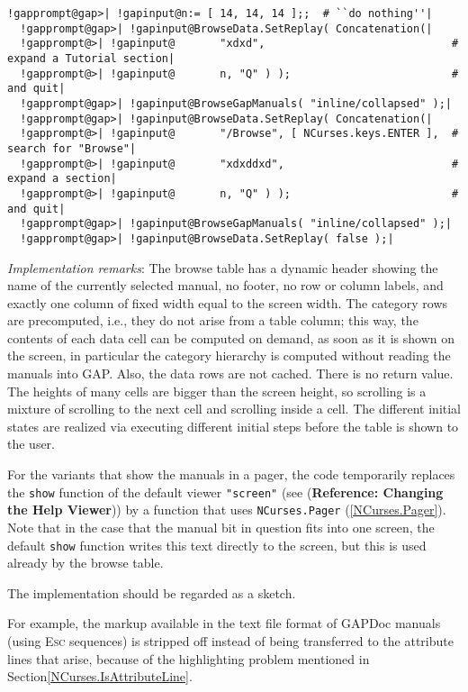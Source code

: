 \documentclass[a4paper,11pt]{report}
\begin{document}
{{{ 
\begin{Verbatim}[commandchars=!@|,fontsize=\small,frame=single,label=Example]
  !gapprompt@gap>| !gapinput@n:= [ 14, 14, 14 ];;  # ``do nothing''|
  !gapprompt@gap>| !gapinput@BrowseData.SetReplay( Concatenation(|
  !gapprompt@>| !gapinput@       "xdxd",                             # expand a Tutorial section|
  !gapprompt@>| !gapinput@       n, "Q" ) );                         # and quit|
  !gapprompt@gap>| !gapinput@BrowseGapManuals( "inline/collapsed" );|
  !gapprompt@gap>| !gapinput@BrowseData.SetReplay( Concatenation(|
  !gapprompt@>| !gapinput@       "/Browse", [ NCurses.keys.ENTER ],  # search for "Browse"|
  !gapprompt@>| !gapinput@       "xdxddxd",                          # expand a section|
  !gapprompt@>| !gapinput@       n, "Q" ) );                         # and quit|
  !gapprompt@gap>| !gapinput@BrowseGapManuals( "inline/collapsed" );|
  !gapprompt@gap>| !gapinput@BrowseData.SetReplay( false );|
\end{Verbatim}
 

 \emph{Implementation remarks}: The browse table has a dynamic header showing the name of the currently
selected manual, no footer, no row or column labels, and exactly one column of
fixed width equal to the screen width. The category rows are precomputed,
i.{\nobreakspace}e., they do not arise from a table column; this way, the
contents of each data cell can be computed on demand, as soon as it is shown
on the screen, in particular the category hierarchy is computed without
reading the manuals into \textsf{GAP}. Also, the data rows are not cached. There is no return value. The heights of
many cells are bigger than the screen height, so scrolling is a mixture of
scrolling to the next cell and scrolling inside a cell. The different initial
states are realized via executing different initial steps before the table is
shown to the user. 

 For the variants that show the manuals in a pager, the code temporarily
replaces the \texttt{show} function of the default viewer \texttt{"screen"} (see  (\textbf{Reference: Changing the Help Viewer})) by a function that uses \texttt{NCurses.Pager} (\ref{NCurses.Pager}). Note that in the case that the manual bit in question fits into one screen,
the default \texttt{show} function writes this text directly to the screen, but this is used already by
the browse table. 

 The implementation should be regarded as a sketch. 

 For example, the markup available in the text file format of \textsf{GAPDoc} manuals (using \textsc{Esc} sequences) is stripped off instead of being transferred to the attribute lines
that arise, because of the highlighting problem mentioned in
Section{\nobreakspace}\ref{NCurses.IsAttributeLine}. 

}}}
\end{document}

